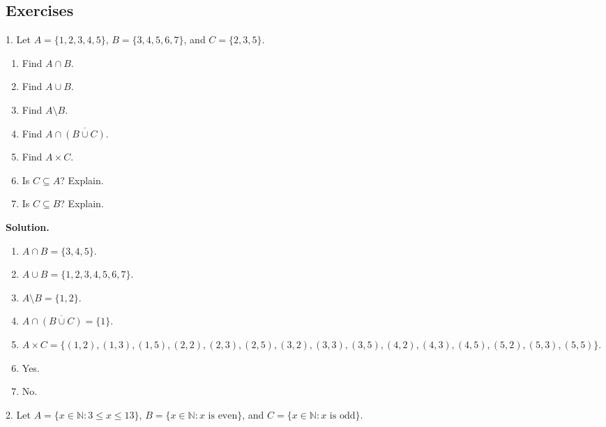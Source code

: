 \documentclass[10pt,]{book}
\theoremstyle{plain}
\theoremstyle{definition}
\theoremstyle{definition}
\theoremstyle{definition}
\numberwithin{equation}{section}
\def\N{\mathbb N}
\def\st{:}
\renewcommand{\bar}{\overline}
\begin{document}
\subsection[Exercises]{Exercises}\label{exercises-2}
\begin{exerciselist}
\item[1.]\hypertarget{exercise-11}{}
          Let \(A = \{1,2,3,4,5\}\), \(B = \{3,4,5,6,7\}\), and \(C = \{2,3,5\}\).
\leavevmode%
\begin{enumerate}[label=(\alph*)]
\item\hypertarget{li-228}{} Find \(A \cap B\). %
\item\hypertarget{li-229}{} Find \(A \cup B\). %
\item\hypertarget{li-230}{} Find \(A \setminus B\). %
\item\hypertarget{li-231}{} Find \(A \cap \overline{(B \cup C)}\). %
\item\hypertarget{li-232}{} Find \(A \times C\). %
\item\hypertarget{li-233}{} Is \(C \subseteq A\)? Explain. %
\item\hypertarget{li-234}{} Is \(C \subseteq B\)? Explain. %
\end{enumerate}
\par\smallskip
\par\smallskip
\noindent\textbf{Solution.}\hypertarget{solution-23}{}\quad
\leavevmode%
\begin{enumerate}[label=(\alph*)]
\item\hypertarget{li-235}{}\(A \cap B = \{3,4,5\}\).%
\item\hypertarget{li-236}{}\(A \cup B = \{1,2,3,4,5,6,7\}\).%
\item\hypertarget{li-237}{}\(A \setminus B = \{1,2\}\).%
\item\hypertarget{li-238}{}\(A \cap \bar{(B \cup C)} = \{1\}\).%
\item\hypertarget{li-239}{}\(A \times C = \{(1,2), (1,3), (1,5), (2,2), (2,3), (2,5), (3,2), (3,3), (3,5), (4,2), (4,3), (4,5), (5,2), (5,3), (5,5)\}\).%
\item\hypertarget{li-240}{}Yes.%
\item\hypertarget{li-241}{}No.%
\end{enumerate}
\item[2.]\hypertarget{exercise-12}{}
          Let \(A = \{x \in \N \st 3 \le x \le 13\}\), \(B = \{x \in \N \st x \mbox{ is even} \}\), and \(C = \{x \in \N \st x \mbox{ is odd} \}\).
\leavevmode%
\begin{enumerate}[label=(\alph*)]

\end{enumerate}
\end{exerciselist}
\end{document}
